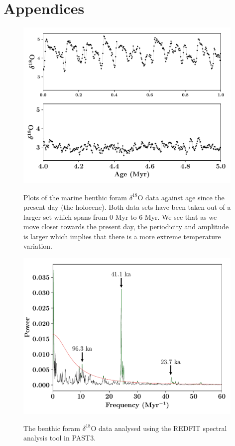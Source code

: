 \documentclass[12pt, onecolumn]{revtex4}    %
\begin{document}
\newpage





\newpage

\section*{Appendices}
\begin{figure}[!h]
\begin{center}
\includegraphics[width=11cm]{figures/foram_data}
\caption[]{Plots of the marine benthic foram $\delta^{18}$O data against age since the present day (the holocene). Both data sets have been taken out of a larger set which spans from 0 Myr to 6 Myr. We see that as we move closer towards the present day, the periodicity and amplitude is larger which implies that there is a more extreme temperature variation.}
\vspace{-3ex}
\label{fig:foram_data}
\end{center}
\end{figure}

\begin{figure}[!h]
\begin{center}
\includegraphics[width=11cm]{figures/d18O_redfit}
\caption[]{The benthic foram $\delta^{18}$O data analysed using the REDFIT spectral analysis tool in PAST3.}
\vspace{-3ex}
\label{fig:d18o_redfit}
\end{center}
\end{figure}
\end{document}
